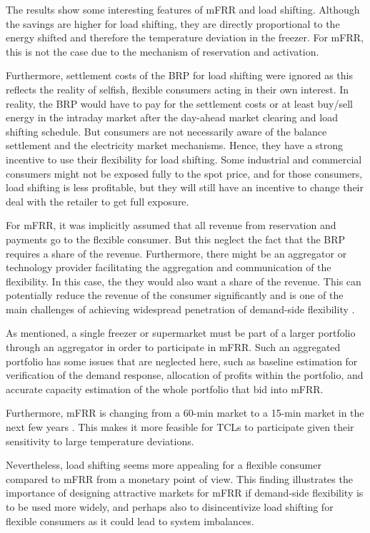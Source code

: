 The results show some interesting features of mFRR and load shifting. Although the savings are higher for load shifting, they are directly proportional to the energy shifted and therefore the temperature deviation in the freezer. For mFRR, this is not the case due to the mechanism of reservation and activation.

Furthermore, settlement costs of the BRP for load shifting were ignored as this reflects the reality of selfish, flexible consumers acting in their own interest. In reality, the BRP would have to pay for the settlement costs or at least buy/sell energy in the intraday market after the day-ahead market clearing and load shifting schedule. But consumers are not necessarily aware of the balance settlement and the electricity market mechanisms. Hence, they have a strong incentive to use their flexibility for load shifting. Some industrial and commercial consumers might not be exposed fully to the spot price, and for those consumers, load shifting is less profitable, but they will still have an incentive to change their deal with the retailer to get full exposure.

For mFRR, it was implicitly assumed that all revenue from reservation and payments go to the flexible consumer. But this neglect the fact that the BRP requires a share of the revenue. Furthermore, there might be an aggregator or technology provider facilitating the aggregation and communication of the flexibility. In this case, the they would also want a share of the revenue. This can potentially reduce the revenue of the consumer significantly and is one of the main challenges of achieving widespread penetration of demand-side flexibility \cite{gade2022ecosystem}.

As mentioned, a single freezer or supermarket must be part of a larger portfolio through an aggregator in order to participate in mFRR. Such an aggregated portfolio has some issues that are neglected here, such as baseline estimation for verification of the demand response, allocation of profits within the portfolio, and accurate capacity estimation of the whole portfolio that bid into mFRR.

Furthermore, mFRR is changing from a 60-min market to a 15-min market in the next few years \cite{MARI}. This makes it more feasible for TCLs to participate given their sensitivity to large temperature deviations.

Nevertheless, load shifting seems more appealing for a flexible consumer compared to mFRR from a monetary point of view. This finding illustrates the importance of designing attractive markets for mFRR if demand-side flexibility is to be used more widely, and perhaps also to disincentivize load shifting for flexible consumers as it could lead to system imbalances.


